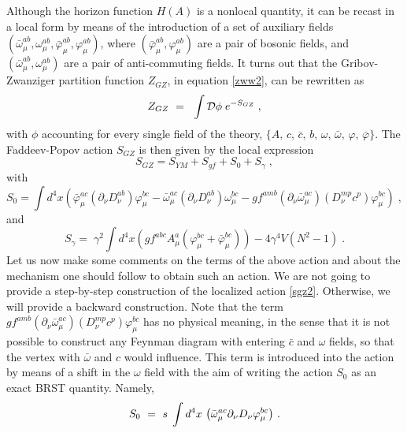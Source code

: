 Although the horizon function $H(A)$ is a nonlocal quantity, it can be recast
in a local form by means of the introduction of a set of auxiliary fields
$(\bar{\omega}_\mu^{ab}, \omega_\mu^{ab}, \bar{\varphi}_\mu^{ab},\varphi_\mu^{ab})$, where
$(\bar{\varphi}_\mu^{ab},\varphi_\mu^{ab})$ are a pair of bosonic fields, and
$(\bar{\omega}_\mu^{ab}, \omega_\mu^{ab})$ are a pair of anti-commuting fields. It turns out
that the Gribov-Zwanziger partition function $Z_{GZ}$, in equation \eqref{zww2}, can be
rewritten as \cite{Vandersickel:2012tz,Zwanziger:1988jt,Zwanziger:1989mf,Zwanziger:1992qr}
\begin{equation}
 Z_{GZ} ~=~ \;
\int {\cal D}\phi \; e^{-S_{GZ}} \;, \label{lzww1}
\end{equation}
with $\phi$ accounting for every single field of the theory,
$\{A,\,c,\,\bar{c},\,b,\,\omega,\,\bar{\omega},\,\varphi,\,\bar{\varphi}\}$. The Faddeev-Popov
action $S_{GZ}$ is then given by the local expression 
\begin{equation} 
S_{GZ} = S_{YM} + S_{gf} + S_0+S_\gamma  \;, 
\label{sgz2}
\end{equation}
with
\begin{equation}
S_0 =\int d^{4}x \left( {\bar \varphi}^{ac}_{\mu} (\partial_\nu D^{ab}_{\nu} )
\varphi^{bc}_{\mu} - {\bar \omega}^{ac}_{\mu}  (\partial_\nu D^{ab}_{\nu} ) \omega^{bc}_{\mu}
- gf^{amb} (\partial_\nu  {\bar \omega}^{ac}_{\mu} ) (D^{mp}_{\nu}c^p) \varphi^{bc}_{\mu}
\right) \;, 
\label{s0}
\end{equation}
and 
\begin{equation}
S_\gamma =\; \gamma^{2} \int d^{4}x \left( gf^{abc}A^{a}_{\mu}(\varphi^{bc}_{\mu} + {\bar \varphi}^{bc}_{\mu})\right)-4 \gamma^4V (N^2-1)\;. 
\label{hfl}
\end{equation} 
Let us now make some comments on the terms of the above action and about the mechanism one
should follow to obtain such an action. We are not going to provide a step-by-step construction
of the localized action \eqref{sgz2}. Otherwise, we will provide a backward construction.
Note that the term $gf^{amb} (\partial_\nu  {\bar \omega}^{ac}_{\mu} ) (D^{mp}_{\nu}c^p)
\varphi^{bc}_{\mu} $ has no physical meaning, in the sense that it is not possible to construct
any Feynman diagram with entering $\bar{c}$ and $\omega$ fields, so that the vertex with
$\bar{\omega}$ and $c$ would influence. This term is introduced into the action by means of a
shift in the $\omega$ field with the aim of writing the action $S_{0}$ as an exact BRST
quantity. Namely,
\begin{eqnarray}
S_{0} ~=~ s\;\int d^{4}x \,\left( \bar{\omega}^{ac}_{\mu} \partial_{\nu}D_{\nu}  \varphi^{bc}_{\mu}
\right)\,.
\label{S0}
\end{eqnarray}
